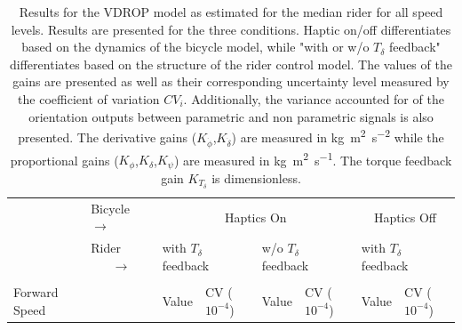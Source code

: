 \begin{table}[]
    \caption{ Results for the VDROP model as estimated for the median rider for all speed levels. Results are presented for the three conditions. Haptic on/off differentiates based on the dynamics of the bicycle model, while "with or w/o \ensuremath{T_\delta} feedback" differentiates based on the structure of the rider control model. The values of the gains are presented as well as their corresponding uncertainty level measured by the coefficient of variation \ensuremath{CV_i}. Additionally, the variance accounted for of the orientation outputs between parametric and non parametric signals is also presented. The derivative gains (\ensuremath{K_{\dot{\phi}}},\ensuremath{K_{\dot{\delta}}}) are measured in \si{\kilogram\square\meter\per\square\second} while the proportional gains (\ensuremath{K_{\phi}},\ensuremath{K_{\delta}},\ensuremath{K_{\psi}}) are measured in \si{\kilogram\square\meter\per\second}. The torque feedback gain \ensuremath{K_{T_\delta}} is dimensionless.}
    \label{tb:predict}
    \begin{tabular}{llcccccc}
    \hline
                                                   & Bicycle $\rightarrow$                                  & \multicolumn{4}{c}{Haptics On}                                                                                                                                                                          & \multicolumn{2}{c}{Haptics Off}                                                                    \\ \cline{2-8} 
                                                   & {\color[HTML]{333333} Rider $\;\;\;\;\;\;\rightarrow$} & \multicolumn{2}{l}{with $T_\delta$ feedback}                                                       & \multicolumn{2}{l}{w/o  $T_\delta$ feedback}                                                       & \multicolumn{2}{l}{with $T_\delta$ feedback}                                                       \\ \cline{2-8} 
                                                   &                                                        & \multicolumn{1}{l}{}                        & \multicolumn{1}{l}{}                                 & \multicolumn{1}{l}{}                        & \multicolumn{1}{l}{}                                 & \multicolumn{1}{l}{}                        & \multicolumn{1}{l}{}                                 \\
    \multirow{-2}{*}{Forward Speed}                &                                                        & \multicolumn{1}{l}{\multirow{-2}{*}{Value}} & \multicolumn{1}{l}{\multirow{-2}{*}{CV ($10^{-4}$)}} & \multicolumn{1}{l}{\multirow{-2}{*}{Value}} & \multicolumn{1}{l}{\multirow{-2}{*}{CV ($10^{-4}$)}} & \multicolumn{1}{l}{\multirow{-2}{*}{Value}} & \multicolumn{1}{l}{\multirow{-2}{*}{CV ($10^{-4}$)}} \\ \hline

\end{tabular}
\end{table}
